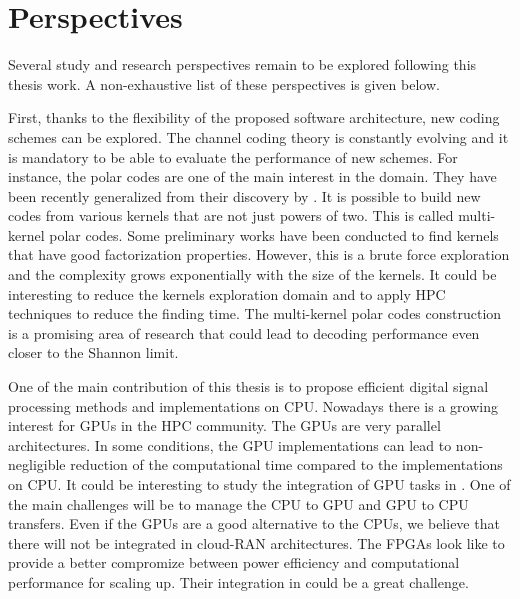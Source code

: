 \newpage
\section*{Perspectives}


Several study and research perspectives remain to be explored following this
thesis work. A non-exhaustive list of these perspectives is given below.

First, thanks to the flexibility of the proposed software architecture, new
coding schemes can be explored. The channel coding theory is constantly evolving
and it is mandatory to be able to evaluate the performance of new schemes. For
instance, the polar codes are one of the main interest in the domain. They have
been recently generalized from their discovery by \Arikan. It is possible to
build new codes from various kernels that are not just powers of two. This is
called multi-kernel polar codes. Some preliminary works have been conducted to
find kernels that have good factorization properties. However, this is a brute
force exploration and the complexity grows exponentially with the size of the
kernels. It could be interesting to reduce the kernels exploration domain and to
apply HPC techniques to reduce the finding time. The multi-kernel polar codes
construction is a promising area of research that could lead to decoding
performance even closer to the Shannon limit.

One of the main contribution of this thesis is to propose efficient digital
signal processing methods and implementations on CPU. Nowadays there is a
growing interest for GPUs in the HPC community. The GPUs are very parallel
architectures. In some conditions, the GPU implementations can lead to
non-negligible reduction of the computational time compared to the
implementations on CPU. It could be interesting to study the integration of
GPU tasks in \AFFECT. One of the main challenges will be to manage the CPU to
GPU and GPU to CPU transfers. Even if the GPUs are a good alternative to the
CPUs, we believe that there will not be integrated in cloud-RAN architectures.
The FPGAs look like to provide a better compromize between power efficiency and
computational performance for scaling up. Their integration in \AFFECT could be
a great challenge.

